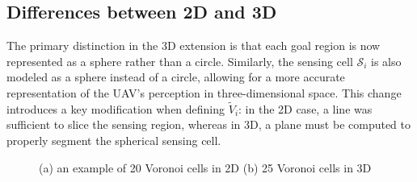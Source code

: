     \subsection{Differences between 2D and 3D}
        The primary distinction in the 3D extension is that each goal region is now represented as a sphere rather than a circle.  
        Similarly, the sensing cell $\mathcal{S}_i$ is also modeled as a sphere instead of a circle, allowing for a more accurate representation of the \ac{UAV}'s perception in three-dimensional space.  
        This change introduces a key modification when defining $\tilde{V}_i$: in the 2D case, a line was sufficient to slice the sensing region, whereas in 3D, a plane must be computed to properly segment the spherical sensing cell. 
        
        \begin{figure}[H]
            \centering
            \caption{
                (a) an example of 20 Voronoi cells in 2D \cite{Voronoi2d} (b) 25 Voronoi cells in 3D \cite{Voronoi3d}
            }
            \label{fig:voronoi_diagrams}
        \end{figure}
    
